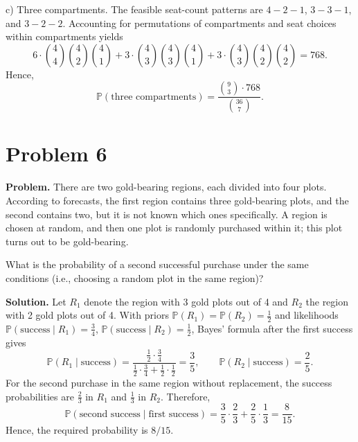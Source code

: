 \documentclass{article}
\begin{document}
c) Three compartments. The feasible seat-count patterns are \(4\!-\!2\!-\!1\), \(3\!-\!3\!-\!1\), and \(3\!-\!2\!-\!2\). Accounting for permutations of compartments and seat choices within compartments yields
\[
6\cdot\binom{4}{4}\binom{4}{2}\binom{4}{1}
+ 3\cdot\binom{4}{3}\binom{4}{3}\binom{4}{1}
+ 3\cdot\binom{4}{3}\binom{4}{2}\binom{4}{2}
= 768.
\]
Hence,
\[
\mathbb{P}(\text{three compartments})
= \frac{\binom{9}{3}\cdot 768}{\binom{36}{7}}.
\]

\section{Problem 6}

\textbf{Problem.} There are two gold-bearing regions, each divided into four plots. According to forecasts, the first region contains three gold-bearing plots, and the second contains two, but it is not known which ones specifically. A region is chosen at random, and then one plot is randomly purchased within it; this plot turns out to be gold-bearing.

What is the probability of a second successful purchase under the same conditions (i.e., choosing a random plot in the same region)?

\textbf{Solution.} Let $R_1$ denote the region with 3 gold plots out of 4 and $R_2$ the region with 2 gold plots out of 4. With priors $\mathbb{P}(R_1)=\mathbb{P}(R_2)=\tfrac12$ and likelihoods $\mathbb{P}(\text{success}\mid R_1)=\tfrac34$, $\mathbb{P}(\text{success}\mid R_2)=\tfrac12$, Bayes' formula after the first success gives
\[
\mathbb{P}(R_1\mid \text{success})=\frac{\tfrac12\cdot\tfrac34}{\tfrac12\cdot\tfrac34+\tfrac12\cdot\tfrac12}=\frac{3}{5},\qquad
\mathbb{P}(R_2\mid \text{success})=\frac{2}{5}.
\]
For the second purchase in the same region without replacement, the success probabilities are $\tfrac{2}{3}$ in $R_1$ and $\tfrac{1}{3}$ in $R_2$. Therefore,
\[
\mathbb{P}(\text{second success}\mid \text{first success})=\frac{3}{5}\cdot\frac{2}{3}+\frac{2}{5}\cdot\frac{1}{3}=\frac{8}{15}.
\]
Hence, the required probability is $8/15$.
\end{document}
